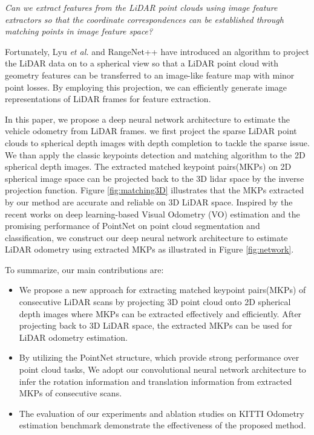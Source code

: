 \documentclass[sigconf]{acmart}
\def\etal{\emph{et al. }}
\begin{document}
\emph{Can we extract features from the LiDAR point clouds using image feature extractors so that the coordinate correspondences can be established through matching points in image feature space?}

Fortunately, Lyu \etal{} \cite{lyu2018real,lyu2018chipnet} and RangeNet++ \cite{milioto2019rangenet++} have introduced an algorithm to project the LiDAR data on to a spherical view so that a LiDAR point cloud with geometry features can be transferred to an image-like feature map with minor point losses. By employing this projection, we can efficiently generate image representations of LiDAR frames for feature extraction.

In this paper, we propose a deep neural network architecture to estimate the vehicle odometry from LiDAR frames. we first project the sparse LiDAR point clouds to spherical depth images with depth completion to tackle the sparse issue. We than apply the classic keypoints detection and matching algorithm to the 2D spherical depth images. The extracted matched keypoint pairs(MKPs) on 2D spherical image space can be projected back to the 3D lidar space by the inverse projection function. Figure \ref{fig:matching3D} illustrates that the MKPs extracted by our method are accurate and reliable on 3D LiDAR space. Inspired by the recent works on deep learning-based Visual Odometry (VO) estimation and the promising performance of PointNet\cite{qi2017pointnet} on point cloud segmentation and classification, we construct our deep neural network architecture to estimate LiDAR odometry using extracted MKPs as illustrated in Figure \ref{fig:network}.   

To summarize, our main contributions are:
\begin{itemize}
\item We propose a new approach for extracting matched keypoint pairs(MKPs) of consecutive LiDAR scans by projecting 3D point cloud onto 2D spherical depth images where MKPs can be extracted effectively and efficiently. After projecting back to 3D LiDAR space, the extracted MKPs can be used for LiDAR odometry estimation. 
\item By utilizing the PointNet structure, which provide strong performance over point cloud tasks, We adopt our convolutional neural network architecture to infer the rotation information and translation information from extracted MKPs of consecutive scans.
\item The evaluation of our experiments and ablation studies on KITTI Odometry estimation benchmark\cite{kitti} demonstrate the effectiveness of the proposed method. 
\end{itemize}
\end{document}
